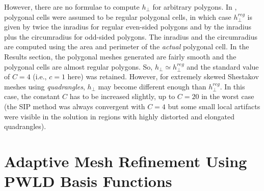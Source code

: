 \documentclass[preprint,10pt]{elsarticle}
\newcommand{\reg}{\textit{reg}}
\begin{document}
However, there are no formulae to compute $h_{\bot}$ for arbitrary polygons. In \cite{TurcksinRagusa2014}, 
polygonal cells were assumed to be regular polygonal cells, in which case $h_{\bot}^\reg$ is given
by twice the inradius for regular even-sided polygons and by the inradius plus the 
circumradius for odd-sided polygons. The inradius and the circumradius are computed 
using the area and perimeter of the {\it actual} polygonal cell. 
%
In the Results section, the polygonal meshes generated are fairly smooth and the polygonal cells are almost 
regular polygons. So, $h_\perp \simeq h^{reg}_\perp$ and the standard value of $C=4$ (i.e., $c=1$ here) was retained. 
%
However, for extremely skewed Shestakov meshes using {\it quadrangles}, $h_\perp $ may become different enough than 
$h^{reg}_\perp$. In this case, the constant $C$ has to be increased slightly, up to $C=20$ in the worst case (the 
SIP method was always convergent with $C=4$ but some small local artifacts were visible in the solution in regions 
with highly distorted and elongated quadrangles).





\section{Adaptive Mesh Refinement Using PWLD Basis Functions} \label{sec:amr}
\end{document}

